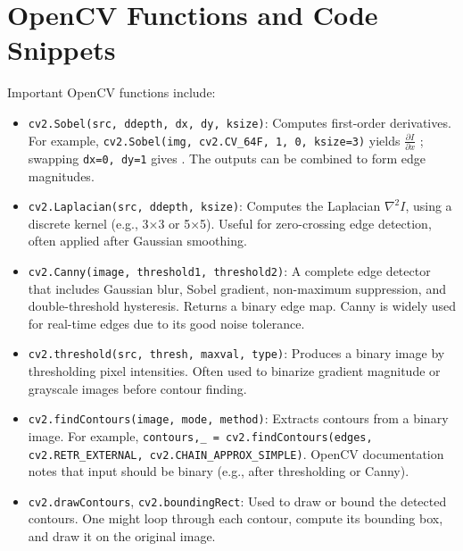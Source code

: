 \documentclass[12pt]{article}
\begin{document}
\section{OpenCV Functions and Code Snippets}
Important OpenCV functions include:
\begin{itemize}
\item \texttt{cv2.Sobel(src, ddepth, dx, dy, ksize)}: Computes first-order derivatives. For example, \texttt{cv2.Sobel(img, cv2.CV\_64F, 1, 0, ksize=3)} yields $\frac{\partial I}{\partial x}$ ; swapping \texttt{dx=0, dy=1} gives . The outputs can be combined to form edge magnitudes.
\item \texttt{cv2.Laplacian(src, ddepth, ksize)}: Computes the Laplacian \( \nabla^2 I \), using a discrete kernel (e.g., 3×3 or 5×5). Useful for zero-crossing edge detection, often applied after Gaussian smoothing.

\item \texttt{cv2.Canny(image, threshold1, threshold2)}: A complete edge detector that includes Gaussian blur, Sobel gradient, non-maximum suppression, and double-threshold hysteresis. Returns a binary edge map. Canny is widely used for real-time edges due to its good noise tolerance.

\item \texttt{cv2.threshold(src, thresh, maxval, type)}: Produces a binary image by thresholding pixel intensities. Often used to binarize gradient magnitude or grayscale images before contour finding.

\item \texttt{cv2.findContours(image, mode, method)}: Extracts contours from a binary image. For example, \texttt{contours,\_ = cv2.findContours(edges, cv2.RETR\_EXTERNAL, cv2.CHAIN\_APPROX\_SIMPLE)}. OpenCV documentation notes that input should be binary (e.g., after thresholding or Canny).

\item \texttt{cv2.drawContours}, \texttt{cv2.boundingRect}: Used to draw or bound the detected contours. One might loop through each contour, compute its bounding box, and draw it on the original image.
\end{itemize}
\end{document}
